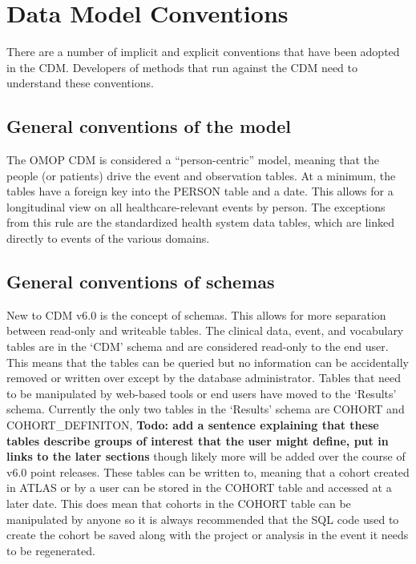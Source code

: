 \documentclass[]{book}
\begin{document}
\section{Data Model Conventions}\label{data-model-conventions}

There are a number of implicit and explicit conventions that have been
adopted in the CDM. Developers of methods that run against the CDM need
to understand these conventions.

\subsection{General conventions of the model}\label{model-conv}

The OMOP CDM is considered a ``person-centric'' model, meaning that the
people (or patients) drive the event and observation tables. At a
minimum, the tables have a foreign key into the PERSON table and a date.
This allows for a longitudinal view on all healthcare-relevant events by
person. The exceptions from this rule are the standardized health system
data tables, which are linked directly to events of the various domains.

\subsection{General conventions of
schemas}\label{general-conventions-of-schemas}

New to CDM v6.0 is the concept of schemas. This allows for more
separation between read-only and writeable tables. The clinical data,
event, and vocabulary tables are in the `CDM' schema and are considered
read-only to the end user. This means that the tables can be queried but
no information can be accidentally removed or written over except by the
database administrator. Tables that need to be manipulated by web-based
tools or end users have moved to the `Results' schema. Currently the
only two tables in the `Results' schema are COHORT and
COHORT\_DEFINITON, \textbf{Todo: add a sentence explaining that these
tables describe groups of interest that the user might define, put in
links to the later sections} though likely more will be added over the
course of v6.0 point releases. These tables can be written to, meaning
that a cohort created in ATLAS or by a user can be stored in the COHORT
table and accessed at a later date. This does mean that cohorts in the
COHORT table can be manipulated by anyone so it is always recommended
that the SQL code used to create the cohort be saved along with the
project or analysis in the event it needs to be regenerated.
\end{document}
